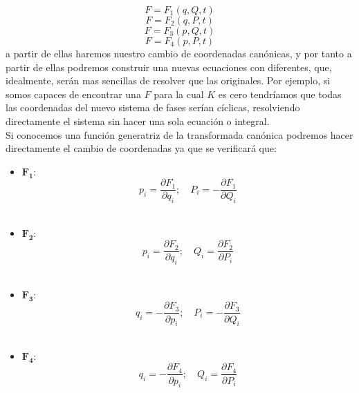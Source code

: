 \documentclass[12pt,a4paper]{article}
\numberwithin{equation}{section}
\numberwithin{figure}{section}
\newcommand{\parciales}[2]{\frac{\partial #1}{\partial #2}}
\begin{document}
\begin{equation}
F = F_1 (q,Q,t)
\end{equation}
\begin{equation}
F = F_2 (q,P,t)
\end{equation}
\begin{equation}
F = F_3 (p,Q,t)
\end{equation}
\begin{equation}
F = F_4 (p,P,t)
\end{equation}
a partir de ellas haremos nuestro cambio de coordenadas canónicas, y por tanto a partir de ellas podremos construir una nuevas ecuaciones con diferentes, que, idealmente, serán mas sencillas de resolver que las originales. Por ejemplo, si somos capaces de encontrar una $F$ para la cual $K$ es cero tendríamos que todas las coordenadas del nuevo sistema de fases serían cíclicas, resolviendo directamente el sistema sin hacer una sola ecuación o integral. \\

Si conocemos una función generatriz de la transformada canónica podremos hacer directamente el cambio de coordenadas ya que se verificará que:
 
\begin{itemize} 
\item $\mathbf{F_1}$:
\begin{equation}
p_i = \parciales{F_1}{q_i}; \quad P_i = - \parciales{F_1}{Q_i} \label{Ec:1.1-piF1}
\end{equation} \\

\item $\mathbf{F_2}$:
\begin{equation}
p_i = \parciales{F_2}{q_i}; \quad Q_i = \parciales{F_2}{P_i} \label{Ec:1.1-piF2}
\end{equation} \\

\item $\mathbf{F_3}$:
\begin{equation}
q_i = - \parciales{F_3}{p_i}; \quad P_i = - \parciales{F_3}{Q_i} \label{Ec:1.1-piF3}
\end{equation}\\

\item $\mathbf{F_4}$:
\begin{equation}
q_i = - \parciales{F_4}{p_i}; \quad Q_i =  \parciales{F_4}{P_i} \label{Ec:1.1-piF4}
\end{equation}
\end{itemize}
\end{document}
